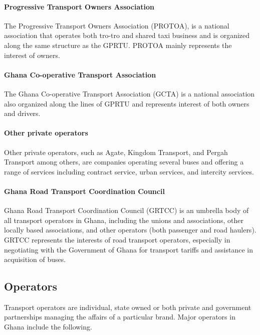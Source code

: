 \paragraph{Progressive Transport Owners Association}
The Progressive Transport Owners Association (PROTOA), is a national association that operates both tro-tro and shared taxi business and is organized along the same structure as the GPRTU. PROTOA mainly represents the interest of owners. 

\paragraph{Ghana Co-operative Transport Association}
The Ghana Co-operative Transport Association (GCTA) is a national association also organized along the lines of GPRTU and represents interest of both owners and drivers.

\paragraph{Other private operators}
Other private operators, such as Agate, Kingdom Transport, and Pergah Transport among others, are companies operating several buses and offering a range of services including contract service, urban services, and intercity services.

\paragraph{Ghana Road Transport Coordination Council}
Ghana Road Transport Coordination Council (GRTCC) is an umbrella body of all transport operators in Ghana, including the unions and associations, other locally based associations, and other operators (both passenger and road haulers). GRTCC represents the interests of road transport operators, especially in negotiating with the Government of Ghana for transport tariffs and assistance in acquisition of buses.

\subsection{Operators}
Transport operators are individual, state owned or both private and government partnerships managing the affairs of a particular brand. Major operators in Ghana include the following.

